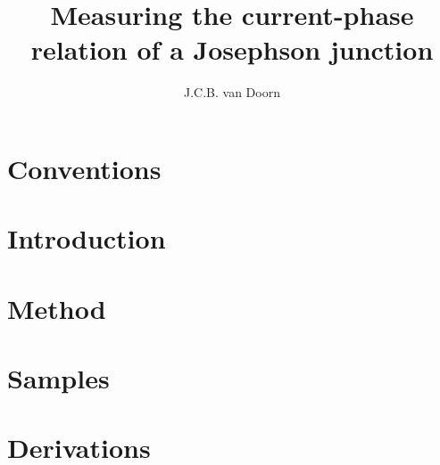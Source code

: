 \documentclass[draft,twoside,single]{lion-msc}
\title{Measuring the current-phase relation of a Josephson junction}
\author{J.C.B. van Doorn}
\begin{document}
	\maketitle

	\tableofcontents

	\chapter*{Conventions}
	
	
	\chapter{Introduction}
	

	\chapter{Method}
	

	\chapter{Samples}
	

	\appendix
	\chapter{Derivations}
	

	\printbibliography
\end{document}
